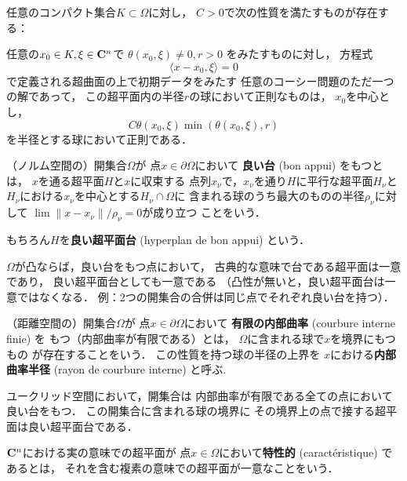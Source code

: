 \begin{THM*}
    任意のコンパクト集合\(K\subset\Omega\)に対し，
    \(C>0\)で次の性質を満たすものが存在する：
    
    任意の\(x_0\in K,\xi\in\mathbf{C}^n\)で
    \(\theta(x_0,\xi)\ne0, r>0\)
    をみたすものに対し，
    方程式
    \[
        \langle x-x_0,\xi\rangle=0
    \]で定義される超曲面の上で初期データをみたす
    任意のコーシー問題のただ一つの解であって，
    この超平面内の半径\(r\)の球において正則なものは，
    \(x_0\)を中心とし，
    \[
        C\theta(x_0,\xi)\min\left(\theta(x_0,\xi),r\right)
    \]
    を半径とする球において正則である．
\end{THM*}

\begin{DFN}
    （ノルム空間の）開集合\(\Omega\)が
    点\(x\in\partial\Omega\)において
    \textbf{良い台} (bon appui) をもつとは，
    \(x\)を通る超平面\(H\)と\(x\)に収束する
    点列\(x_\nu\)で，\(x_\nu\)を通り\(H\)に平行な超平面\(H_\nu\)と
    \(H_\nu\)における\(x_\nu\)を中心とする\(H_\nu\cap\Omega\)に
    含まれる球のうち最大のものの半径\(\rho_\nu\)に対して
    \(\lim\lVert x-x_\nu\rVert/\rho_\nu=0\)が成り立つ
    ことをいう．

    もちろん\(H\)を\textbf{良い超平面台} 
    (hyperplan de bon appui) という．
\end{DFN}
\begin{CMT}
    \(\Omega\)が凸ならば，良い台をもつ点において，
    古典的な意味で台である超平面は一意であり，
    良い超平面台としても一意である
    （凸性が無いと，良い超平面台は一意ではなくなる．
    例：2つの開集合の合併は同じ点でそれぞれ良い台を持つ）．
\end{CMT}
\begin{DFN}
    （距離空間の）開集合\(\Omega\)が
    点\(x\in\partial\Omega\)において
    \textbf{有限の内部曲率} (courbure interne finie) を
    もつ（内部曲率が有限である）とは，
    \(\Omega\)に含まれる球で\(x\)を境界にもつもの
    が存在することをいう．
    この性質を持つ球の半径の上界を
    \(x\)における\textbf{内部曲率半径} 
    (rayon de courbure interne) と呼ぶ.
\end{DFN}
\begin{CMT}
    ユークリッド空間において，開集合は
    内部曲率が有限である全ての点において良い台をもつ．
    この開集合に含まれる球の境界に
    その境界上の点で接する超平面は良い超平面台である．
\end{CMT}
\begin{DFN}
    \(\mathbf{C}^n\)における実の意味での超平面が
    点\(x\in\Omega\)において\textbf{特性的} 
    (caract\'eristique) であるとは，
    それを含む複素の意味での超平面が一意なことをいう．
\end{DFN}
